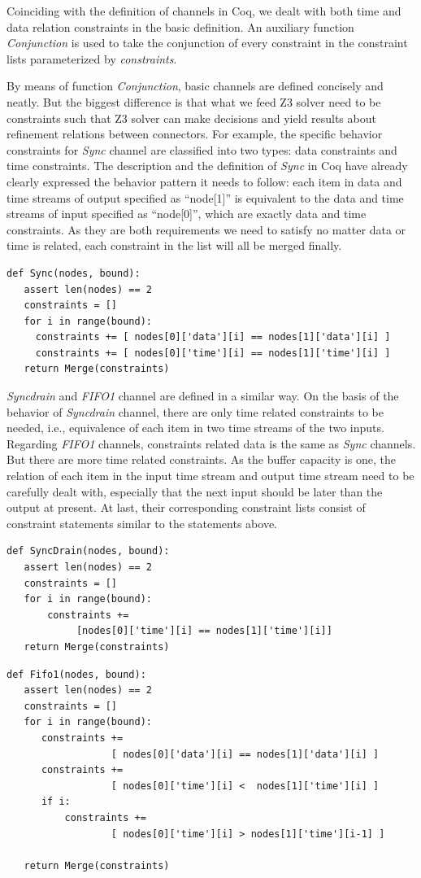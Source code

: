 \documentclass[3p,times]{elsarticle}
\begin{document}
Coinciding with the definition of channels in Coq, we dealt with both time and data relation constraints in the basic definition. An auxiliary function \emph{Conjunction} is used to take the conjunction of every constraint in the constraint lists parameterized by \emph{constraints}.

By means of function \emph{Conjunction}, basic channels are defined concisely and neatly. But the biggest difference is that what we feed Z3 solver need to be constraints such that Z3 solver can make decisions and yield results about refinement relations between connectors. For example, the specific behavior constraints for \emph{Sync} channel are classified into two types: data constraints and time constraints. The description and the definition of \emph{Sync} in Coq have already clearly expressed the behavior pattern it needs to follow: each item in data and time streams of output specified as ``node[1]'' is equivalent to the data and time streams of input specified as ``node[0]'', which are exactly data and time constraints. As they are both requirements we need to satisfy no matter data or time is related, each constraint in the list will all be merged finally.
\lstset{language=Python}
\begin{lstlisting}[frame=single]
def Sync(nodes, bound):
   assert len(nodes) == 2
   constraints = []
   for i in range(bound):
     constraints += [ nodes[0]['data'][i] == nodes[1]['data'][i] ]
     constraints += [ nodes[0]['time'][i] == nodes[1]['time'][i] ]
   return Merge(constraints)
\end{lstlisting}

\emph{Syncdrain} and \emph{FIFO1} channel are defined in a similar way. On the basis of the behavior of \emph{Syncdrain} channel, there are only time related constraints to be needed, i.e., equivalence of each item in two time streams of the two inputs. Regarding \emph{FIFO1} channels, constraints related data is the same as \emph{Sync} channels. But there are more time related constraints. As the buffer capacity is one, the relation of each item in the input time stream and output time stream need to be carefully dealt with, especially that the next input should be later than the output at present. At last, their corresponding constraint lists consist of constraint statements similar to the statements above.
\begin{lstlisting}[frame=single]
def SyncDrain(nodes, bound):
   assert len(nodes) == 2
   constraints = []
   for i in range(bound):
       constraints +=
            [nodes[0]['time'][i] == nodes[1]['time'][i]]
   return Merge(constraints)
\end{lstlisting}
\begin{lstlisting}[frame=single]
def Fifo1(nodes, bound):
   assert len(nodes) == 2
   constraints = []
   for i in range(bound):
      constraints +=
                  [ nodes[0]['data'][i] == nodes[1]['data'][i] ]
      constraints +=
                  [ nodes[0]['time'][i] <  nodes[1]['time'][i] ]
      if i:
          constraints +=
                  [ nodes[0]['time'][i] > nodes[1]['time'][i-1] ]

   return Merge(constraints)
\end{lstlisting}
\end{document}
